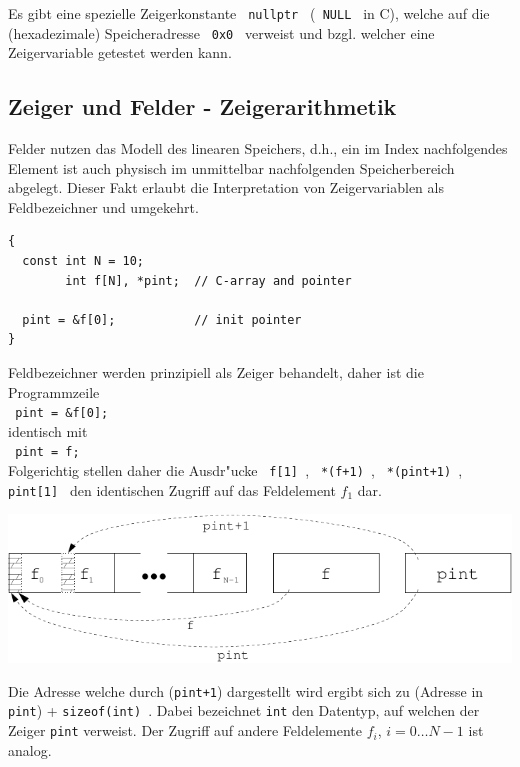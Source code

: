 Es gibt eine spezielle Zeigerkonstante \verb| nullptr |
(\verb| NULL | in C), welche
auf die (hexadezimale) Speicheradresse \verb| 0x0 |
verweist und bzgl. welcher eine
Zeigervariable getestet werden kann.
%
%
\subsection{Zeiger und Felder - Zeigerarithmetik}
\label{p:6.2.3}
%
Felder nutzen das Modell des linearen Speichers, d.h.,
ein im Index nachfolgendes Element ist auch physisch im
unmittelbar nachfolgenden Speicherbereich abgelegt.
Dieser Fakt erlaubt die Interpretation von  Zeigervariablen als
Feldbezeichner und umgekehrt.

\begin{minipage} {0.9\textwidth}
\begin{verbatim}
{
  const int N = 10;
        int f[N], *pint;  // C-array and pointer

  pint = &f[0];           // init pointer
}
\end{verbatim}
\end{minipage}

Feldbezeichner werden prinzipiell als Zeiger behandelt, daher ist die
Programmzeile
\\
\mbox{}\hfill\verb| pint = &f[0]; |\hfill\mbox{}
\\
identisch mit
\\
\mbox{}\hfill\verb| pint = f; |\hfill\mbox{}
\\
Folgerichtig stellen daher die Ausdr"ucke
\verb| f[1] |, \verb| *(f+1) |, \verb| *(pint+1) |, \verb| pint[1] |
den identischen Zugriff auf das Feldelement $f_1$ dar.

% 
\centerline{\includegraphics[scale=0.9]{kap631.pdf}}
%

Die Adresse welche durch (\verb|pint+1|) dargestellt wird
ergibt sich zu (Adresse in \verb|pint|) + \verb|sizeof(int) |.
Dabei bezeichnet \verb|int| den Datentyp, auf welchen der Zeiger
\verb|pint| verweist.
Der Zugriff auf andere Feldelemente $f_i$, $i=0\ldots N-1$ ist analog.

